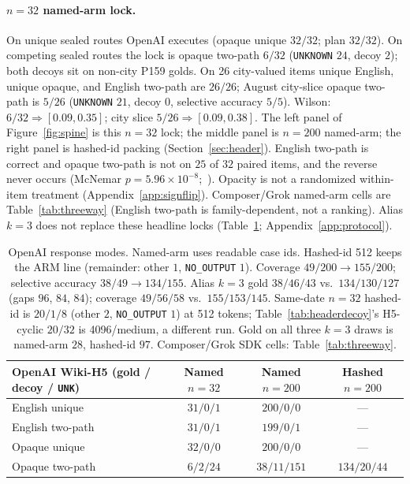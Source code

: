 \documentclass{article}
\begin{document}
\paragraph{$n{=}32$ named-arm lock.}
On unique sealed routes OpenAI executes (opaque unique $32/32$; plan
$32/32$).
On competing sealed routes the lock is opaque two-path $6/32$
(\texttt{UNKNOWN} $24$, decoy $2$); both decoys sit on non-city P159 golds.
On 26 city-valued items unique English, unique opaque, and English
two-path are $26/26$; August city-slice opaque two-path is $5/26$
(\texttt{UNKNOWN} $21$, decoy $0$, selective accuracy $5/5$).
Wilson: $6/32 \Rightarrow [0.09,0.35]$; city slice
$5/26 \Rightarrow [0.09,0.38]$.
The left panel of Figure~\ref{fig:spine} is this $n{=}32$ lock; the middle
panel is $n{=}200$ named-arm; the right panel is hashed-id packing
(Section~\ref{sec:header}).
English two-path is correct and opaque two-path is not on $25$ of $32$
paired items, and the reverse never occurs
(McNemar $p{=}5.96{\times}10^{-8}$;~\citealp{mcnemar1947}).
Opacity is not a randomized within-item treatment
(Appendix~\ref{app:signflip}).
Composer/Grok named-arm cells are Table~\ref{tab:threeway}
(English two-path is family-dependent, not a ranking).
Alias $k{=}3$ does not replace these headline locks
(Table~\ref{tab:modes}; Appendix~\ref{app:protocol}).

\begin{table}[htbp]
\centering
\small
\setlength{\tabcolsep}{3.5pt}
\begin{tabular}{@{}lccc@{}}
\toprule
OpenAI Wiki-H5 (gold / decoy / \texttt{UNK}) & Named $n{=}32$ & Named $n{=}200$ & Hashed $n{=}200$ \\
\midrule
English unique & $31/0/1$ & $200/0/0$ & --- \\
English two-path & $31/0/1$ & $199/0/1$ & --- \\
Opaque unique & $32/0/0$ & $200/0/0$ & --- \\
Opaque two-path & $6/2/24$ & $38/11/151$ & $134/20/44$ \\
\bottomrule
\end{tabular}
\caption{OpenAI response modes. Named-arm uses readable case ids.
Hashed-id 512 keeps the ARM line (remainder: other $1$, \texttt{NO\_OUTPUT} $1$).
Coverage $49/200\to 155/200$; selective accuracy $38/49\to 134/155$.
Alias $k{=}3$ gold $38/46/43$ vs.\ $134/130/127$ (gaps $96$, $84$, $84$);
coverage $49/56/58$ vs.\ $155/153/145$.
Same-date $n{=}32$ hashed-id is $20/1/8$ (other $2$, \texttt{NO\_OUTPUT} $1$)
at 512 tokens; Table~\ref{tab:headerdecoy}'s H5-cyclic $20/32$ is
4096/medium, a different run.
Gold on all three $k{=}3$ draws is named-arm $28$, hashed-id $97$.
Composer/Grok SDK cells: Table~\ref{tab:threeway}.}
\label{tab:modes}
\end{table}
\end{document}
